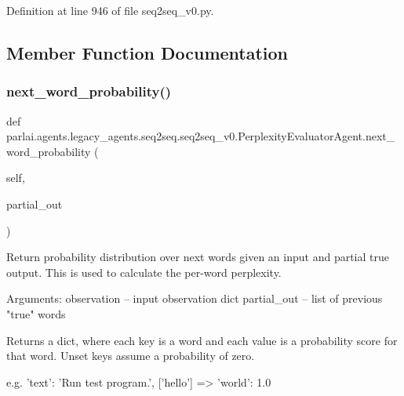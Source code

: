 Definition at line 946 of file seq2seq\+\_\+v0.\+py.



\subsection{Member Function Documentation}
\mbox{\label{classparlai_1_1agents_1_1legacy__agents_1_1seq2seq_1_1seq2seq__v0_1_1PerplexityEvaluatorAgent_ab6f67e52990f7cafdb7fbd2f6215e968}} 
\subsubsection{\texorpdfstring{next\+\_\+word\+\_\+probability()}{next\_word\_probability()}}
{\footnotesize\ttfamily def parlai.\+agents.\+legacy\+\_\+agents.\+seq2seq.\+seq2seq\+\_\+v0.\+Perplexity\+Evaluator\+Agent.\+next\+\_\+word\+\_\+probability (\begin{DoxyParamCaption}\item[{}]{self,  }\item[{}]{partial\+\_\+out }\end{DoxyParamCaption})}

\begin{DoxyVerb}Return probability distribution over next words given an input and
partial true output. This is used to calculate the per-word perplexity.

Arguments:
observation -- input observation dict
partial_out -- list of previous "true" words

Returns a dict, where each key is a word and each value is a probability
score for that word. Unset keys assume a probability of zero.

e.g.
{'text': 'Run test program.'}, ['hello'] => {'world': 1.0}
\end{DoxyVerb}
 

